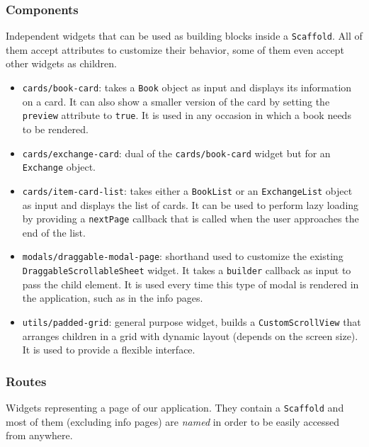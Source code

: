 \subsubsection{Components}
Independent widgets that can be used as building blocks inside a \texttt{Scaffold}.
All of them accept attributes to customize their behavior, some of them even accept other widgets as children.

\begin{itemize}
    \item \texttt{cards/book-card}:
          takes a \texttt{Book} object as input and displays its information on a card.
          It can also show a smaller version of the card by setting the \texttt{preview} attribute to \texttt{true}.
          It is used in any occasion in which a book needs to be rendered.
    \item \texttt{cards/exchange-card}:
          dual of the \texttt{cards/book-card} widget but for an \texttt{Exchange} object.
    \item \texttt{cards/item-card-list}:
          takes either a \texttt{BookList} or an \texttt{ExchangeList} object as input and displays the list of cards.
          It can be used to perform lazy loading by providing a \texttt{nextPage} callback that is called when the user
          approaches the end of the list.
    \item \texttt{modals/draggable-modal-page}:
          shorthand used to customize the existing \texttt{DraggableScrollableSheet} widget.
          It takes a \texttt{builder} callback as input to pass the child element.
          It is used every time this type of modal is rendered in the application, such as in the info pages.
    \item \texttt{utils/padded-grid}:
          general purpose widget, builds a \texttt{CustomScrollView} that arranges children in a grid with
          dynamic layout (depends on the screen size). It is used to provide a flexible interface.
\end{itemize}

\subsubsection{Routes}
Widgets representing a page of our application.
They contain a \texttt{Scaffold} and most of them (excluding info pages) are \emph{named} in order to be easily accessed from anywhere.

